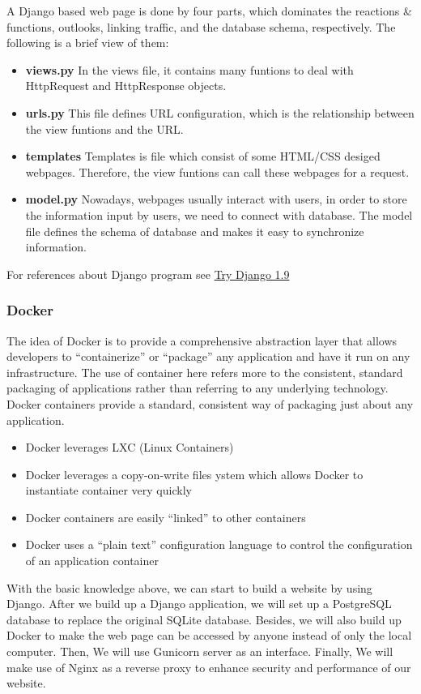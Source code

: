 A Django based web page is done by four parts, which dominates the reactions 
\& functions, outlooks, linking traffic, and the database schema, respectively. 
The following is a brief view of them:
\begin{itemize}
	\item[] \textbf{views.py}
	In the views file, it contains many funtions to deal with HttpRequest and  HttpResponse objects.
	\item[] \textbf{urls.py}
	This file defines URL configuration, which is the relationship between the view funtions and the URL.
	\item[] \textbf{templates}
	Templates is file which consist of some HTML/CSS desiged webpages. Therefore, the view funtions can call these webpages for a request.
	\item[] \textbf{model.py}
	Nowadays, webpages usually interact with users, in order to store the information input by users, we need to connect with database. 
	The model file defines the schema of database and makes it easy to synchronize information.\\
\end{itemize}
For references about Django program see \href{https://www.youtube.com/watch?v=yfgsklK_yFo&list=PLEsfXFp6DpzQFqfCur9CJ4QnKQTVXUsRy&index=1}{Try Django 1.9}

\subsubsection*{Docker}
The idea of Docker is to provide a comprehensive abstraction
layer that allows developers to “containerize” or “package” 
any application and have it run on any infrastructure. The 
use of container here refers more to the consistent, standard 
packaging of applications rather than referring to any underlying 
technology. Docker containers provide a standard, consistent way 
of packaging just about any application. 
\begin{itemize}
	\item Docker leverages LXC (Linux Containers)
	\item Docker leverages a copy-on-write files ystem which allows Docker to instantiate container very quickly
	\item Docker containers are easily “linked” to other containers
	\item Docker uses a “plain text” configuration language to control the configuration of an application container
\end{itemize}


With the basic knowledge above, we can start to build a website by using Django. 
After we build up a Django application, we will set up a PostgreSQL database to replace the original SQLite database. 
Besides, we will also build up Docker to make the web page can be accessed by anyone instead of only the local computer.
Then, We will use Gunicorn server as an interface. 
Finally, We will make use of Nginx as a reverse proxy to enhance security and performance of our website.